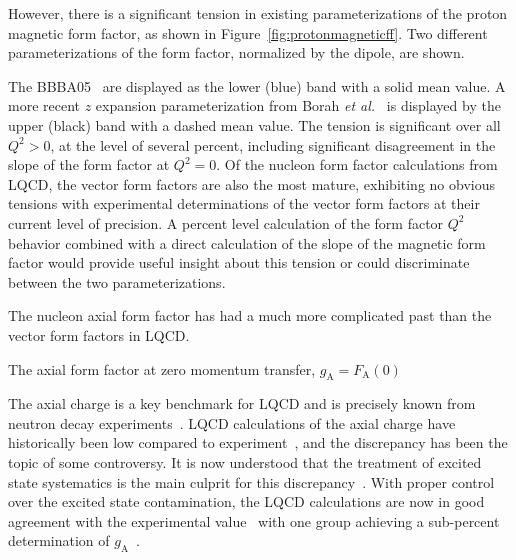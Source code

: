 \documentclass{ar-1col}
\begin{document}
However, there is a significant tension in existing parameterizations of the proton magnetic form factor, as
shown in Figure~\ref{fig:protonmagneticff}.
Two different parameterizations of the form factor, normalized by the dipole, are shown.%
\begin{marginnote}
\end{marginnote}%
The BBBA05~\cite{Bradford:2006yz} are displayed as the lower (blue) band with a solid mean value.
A more recent $z$ expansion parameterization from Borah {\it et al.}~\cite{Borah:2020gte} is displayed by the upper (black) band with a dashed mean value.
The tension is significant over all $Q^2 > 0$, at the level of several percent,
including significant disagreement in the slope of the form factor at $Q^2 = 0$.
Of the nucleon form factor calculations from LQCD,
the vector form factors are also the most mature,
exhibiting no obvious tensions with experimental determinations
of the vector form factors at their current level of precision.
A percent level calculation of the form factor $Q^2$ behavior combined with a direct calculation of the slope of the magnetic form factor would provide useful insight about this tension or could discriminate
between the two parameterizations.

The nucleon axial form factor has had a much more complicated past than the vector form factors in LQCD.%
\begin{marginnote}
  {The axial form factor at zero momentum transfer, $g_{\mathrm{A}} = F_{\mathrm{A}}(0)$}
\end{marginnote}%
The axial charge is a key benchmark for LQCD and is precisely known
from neutron decay experiments~\cite{Dubbers:2021wqv}.
LQCD calculations of the axial charge have historically been low compared to experiment~\cite{Aoki:2021kgd},
 and the discrepancy has been the topic of some controversy.
It is now understood that the treatment of excited state systematics is the main culprit for this discrepancy~\cite{Bar:2017kxh,Ottnad:2020qbw,Aoki:2021kgd}.
With proper control over the excited state contamination, the LQCD calculations are now in good agreement with the experimental value~\cite{Jang:2019vkm,Gupta:2018qil,Alexandrou:2020okk,Abramczyk:2019fnf,Park:2021ypf,RQCD:2019jai,Hasan:2019noy,Djukanovic:2021yqg,Harris:2019bih,Liang:2018pis,Shintani:2018ozy,Ishikawa:2018rew}
 with one group achieving a sub-percent determination of $g_{\mathrm{A}}$~\cite{Chang:2018uxx,Berkowitz:2018gqe,Walker-Loud:2019cif}.
\end{document}
